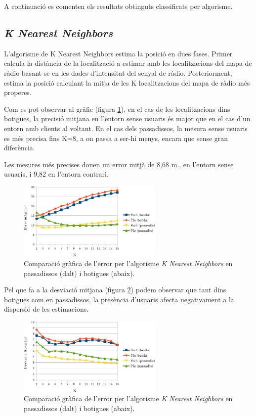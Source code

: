 A continuació es comenten els resultats obtinguts classificats per algorisme.

\subsection{\textit{K Nearest Neighbors}}

L'algorisme de K Nearest Neighbors estima la posició en dues fases. Primer calcula la distància de la localització a estimar amb les localitzacions del mapa de ràdio basant-se en les dades d'intensitat del senyal de ràdio. Posteriorment, estima la posició calculant la mitja de les K localitzacions del mapa de ràdio més properes.

Com es pot observar al gràfic (figura \ref{fig:grafic_mitja_KNN}), en el cas de les localitzacions dins botigues, la precisió mitjana en l'entorn sense usuaris és major que en el cas d'un entorn amb clients al voltant. En el cas dels passadissos, la mesura sense usuaris es més precisa fins K=8, a on passa a ser-hi menys, encara que sense gran diferència.

Les mesures més precises donen un error mitjà de 8,68 m., en l'entorn sense usuaris, i 9,82 en l'entorn contrari.

\begin{figure}[ht]
\begin{center}
\includegraphics[width=7cm]{imatges/knn_mitja.png}
\caption{Comparació gràfica de l'error per l'algorisme \textit{K Nearest Neighbors} en passadissos (dalt) i botigues (abaix).}
\label{fig:grafic_mitja_KNN}
\end{center}
\end{figure}

Pel que fa a la desviació mitjana (figura \ref{fig:grafic_desviacio_KNN}) podem observar que tant dins botigues com en passadissos, la presència d'usuaris afecta negativament a la dispersió de les estimacions.

\begin{figure}[ht]
\begin{center}
\includegraphics[width=7cm]{imatges/knn_desviacio.png}
\caption{Comparació gràfica de l'error per l'algorisme \textit{K Nearest Neighbors} en passadissos (dalt) i botigues (abaix).}
\label{fig:grafic_desviacio_KNN}
\end{center}
\end{figure}


